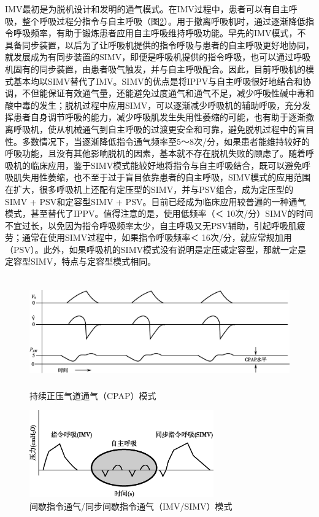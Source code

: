 IMV最初是为脱机设计和发明的通气模式。在IMV过程中，患者可以有自主呼吸，整个呼吸过程分指令与自主呼吸（图\ref{fig136-3}）。用于撤离呼吸机时，通过逐渐降低指令呼吸频率，有助于锻炼患者应用自主呼吸维持呼吸功能。早先的IMV模式，不具备同步装置，以后为了让呼吸机提供的指令呼吸与患者的自主呼吸更好地协同，就发展成为有同步装置的SIMV，即便是呼吸机提供的指令呼吸，也可以通过呼吸机固有的同步装置，由患者吸气触发，并与自主呼吸配合。因此，目前呼吸机的模式基本均以SIMV替代了IMV。SIMV的优点是将IPPV与自主呼吸很好地结合和协调，不但能保证有效通气量，还能避免过度通气和通气不足，减少呼吸性碱中毒和酸中毒的发生；脱机过程中应用SIMV，可以逐渐减少呼吸机的辅助呼吸，充分发挥患者自身调节呼吸的能力，减少呼吸肌发生失用性萎缩的可能，也有助于逐渐撤离呼吸机，使从机械通气到自主呼吸的过渡更安全和可靠，避免脱机过程中的盲目性。多数情况下，当逐渐降低指令通气频率至5～8次/分，如果患者能维持较好的呼吸功能，且没有其他影响脱机的因素，基本就不存在脱机失败的顾虑了。随着呼吸机的临床应用，鉴于SIMV模式能较好地将指令与自主呼吸结合，既可以避免呼吸肌失用性萎缩，也不至于过于盲目依靠患者的自主呼吸，SIMV模式的应用范围在扩大，很多呼吸机上还配有定压型的SIMV，并与PSV组合，成为定压型的SIMV
+ PSV和定容型SIMV +
PSV。目前已经成为临床应用较普遍的一种通气模式，甚至替代了IPPV。值得注意的是，使用低频率（＜
10次/分）SIMV的时间不宜过长，以免因为指令呼吸频率太少，自主呼吸又无PSV辅助，引起呼吸肌疲劳；通常在使用SIMV过程中，如果指令呼吸频率＜
16次/分，就应常规加用（PSV）。此外，如果呼吸机的SIMV模式没有说明是定压或定容型，那就一定是定容型SIMV，特点与定容型模式相同。

\begin{figure}[!htbp]
 \centering
 \includegraphics[width=5.83333in,height=1.875in]{./images/Image00508.jpg}
 \captionsetup{justification=centering}
 \caption{持续正压气道通气（CPAP）模式}
 \label{fig136-2}
  \end{figure} 

\begin{figure}[!htbp]
 \centering
 \includegraphics[width=3.125in,height=1.47917in]{./images/Image00509.jpg}
 \captionsetup{justification=centering}
 \caption{间歇指令通气/同步间歇指令通气（IMV/SIMV）模式}
 \label{fig136-3}
  \end{figure} 

